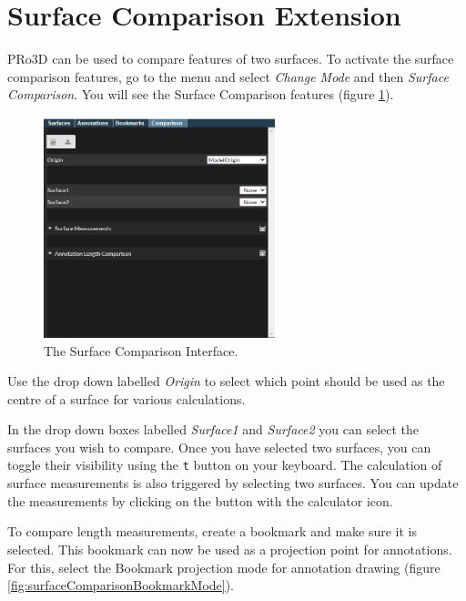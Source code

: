 \section{Surface Comparison Extension}

PRo3D can be used to compare features of two surfaces. To activate the surface comparison features, go to the menu and select \emph{Change Mode} and then \emph{Surface Comparison}. You will see the Surface Comparison features (figure  \ref{fig:surfaceComparison}).


\begin{figure}[h]
	\centering
	\includegraphics[width=0.6\textwidth]{pics/surfaceComparisonV0.1.PNG}
	\caption[The surface comparison interface.]{The Surface Comparison Interface.}
	\label{fig:surfaceComparison}
\end{figure}

Use the drop down labelled \emph{Origin} to select which point should be used as the centre of a surface for various calculations.

In the drop down boxes labelled \emph{Surface1} and \emph{Surface2} you can select the surfaces you wish to compare. Once you have selected two surfaces, you can toggle their visibility using the \texttt{t} button on your keyboard. The calculation of surface measurements is also triggered by selecting two surfaces. You can update the measurements by clicking on the button with the calculator icon.

To compare length measurements, create a bookmark and make sure it is selected. This bookmark can now be used as a projection point for annotations. For this, select the Bookmark projection mode for annotation drawing (figure \ref{fig:surfaceComparisonBookmarkMode}).

